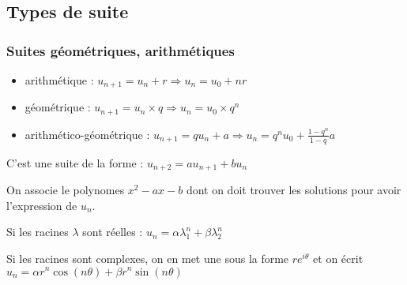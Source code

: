 \documentclass[french]{yLectureNote}
\begin{document}
\subsection{Types de suite}
\subsubsection{Suites géométriques, arithmétiques}
\begin{definition}
\begin{itemize}
 \item arithmétique : $u_{n+1} = u_n + r \Rightarrow u_n = u_0+nr$
 \item géométrique : $u_{n+1} = u_n \times q \Rightarrow u_n = u_0\times q^n$
 \item arithmético-géométrique : $u_{n+1} = q u_n +a \Rightarrow u_n = q^n u_0 + \frac{1-q^n}{1-q}a$
\end{itemize}
\end{definition}
\begin{definition}
C'est une suite de la forme : $u_{n+2} = au_{n+1} + bu_{n}$

On associe le polynomes $x^2-ax-b$ dont on doit trouver les solutions pour avoir l'expression de $u_n$.


\end{definition}
\begin{theorem}
 Si les racines $\lambda$ sont réelles : $u_n = \alpha\lambda_1^n+\beta\lambda_2^n$

 Si les racines sont complexes, on en met une sous la forme $re^{i\theta}$ et on écrit $u_n = \alpha r^n \cos(n\theta)+\beta r^n \sin(n\theta)$
\end{theorem}
\end{document}
